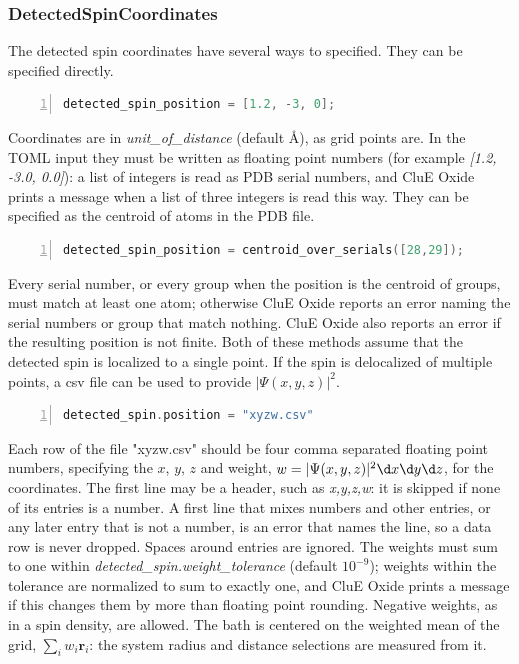 \documentclass{book}
\begin{document}
\subsubsection{DetectedSpinCoordinates} %
The detected spin coordinates have several ways to specified.
They can be specified directly.
\begin{lstlisting}[frame=single,numbers=left,language=c]
detected_spin_position = [1.2, -3, 0];
\end{lstlisting}
Coordinates are in \textit{unit\_of\_distance} (default \AA), as grid points
are. In the TOML input they must be written as floating point numbers
(for example \textit{[1.2, -3.0, 0.0]}): a list of integers is read as PDB 
serial numbers, and CluE Oxide prints a message when a list of three 
integers is read this way.
They can be specified as the centroid of atoms in the PDB file.
\begin{lstlisting}[frame=single,numbers=left,language=c]
detected_spin_position = centroid_over_serials([28,29]);
\end{lstlisting}
Every serial number, or every group when the position is the centroid of 
groups, must match at least one atom; otherwise CluE Oxide reports an error 
naming the serial numbers or group that match nothing.
CluE Oxide also reports an error if the resulting position is not finite.
Both of these methods assume that the detected spin is localized to a single
point.  If the spin is delocalized of multiple points, a csv file can be used
to provide $|\Psi(x,y,z)|^2$.  
\begin{lstlisting}[frame=single,numbers=left,language=c]
detected_spin.position = "xyzw.csv"
\end{lstlisting}
Each row of the file "xyzw.csv" should be four comma separated floating point
numbers, specifying the $x$, $y$, $z$ and weight,
$w = |\Psi(x,y,z)|^2 \d x \d y \d z$, for the coordinates.
The first line may be a header, such as \textit{x,y,z,w}: it is skipped if 
none of its entries is a number.  A first line that mixes numbers and other 
entries, or any later entry that is not a number, is an error that names the
line, so a data row is never dropped. Spaces around entries are ignored.
The weights must sum to one within \textit{detected\_spin.weight\_tolerance}
(default $10^{-9}$); weights within the tolerance are normalized to sum to 
exactly one, and CluE Oxide prints a message if this changes them by more 
than floating point rounding. Negative weights, as in a spin density, are 
allowed.
The bath is centered on the weighted mean of the grid, $\sum_i w_i \mathbf{r}_i$:
the system radius and distance selections are measured from it.
\end{document}
